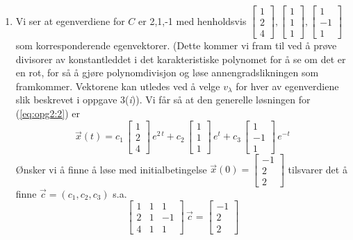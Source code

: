 \documentclass{article}[norsk]
\begin{document}
\begin{enumerate}[label=(\textit{\roman*})]
	\item
    Vi ser at egenverdiene for $C$ er 2,1,-1 med henholdsvis $\displaystyle \begin{bmatrix} 1\\2\\4 \end{bmatrix},\begin{bmatrix} 1\\1\\1 \end{bmatrix},\begin{bmatrix} 1\\-1\\1 \end{bmatrix}$ som korresponderende egenvektorer. (Dette kommer vi fram til ved å prøve divisorer av konstantleddet i det karakteristiske polynomet for å se om det er en rot, for så å gjøre polynomdivisjon og løse annengradslikningen som framkommer. Vektorene kan utledes ved å velge $v_\lambda$ for hver av egenverdiene slik beskrevet i oppgave 3(\textit{i})). Vi får så at den generelle løsningen for (\ref{eq:opg2:2}) er 
    \begin{equation*}
    	\vec{x}(t)=c_1\,\begin{bmatrix} 1\\2\\4 \end{bmatrix}\,e^{2\,t}+c_2\,\begin{bmatrix}1\\1\\1\end{bmatrix}\,e^{t}+c_3\,\begin{bmatrix} 1\\-1\\1\end{bmatrix}\,e^{-t}
    \end{equation*}
    Ønsker vi å finne å løse med initialbetingelse $\vec{x}(0)=\begin{bmatrix}-1\\2\\2\end{bmatrix}$ tilsvarer det å finne $\vec{c} =\left(c_1,c_2,c_3\right)$ s.a. 
    \begin{equation*}
    	\begin{bmatrix}
        	1&1&1\\
            2&1&-1\\
            4&1&1
		\end{bmatrix}\,\vec{c}=\begin{bmatrix}-1\\2\\2\end{bmatrix}

\end{equation*}
\end{enumerate}
\end{document}

